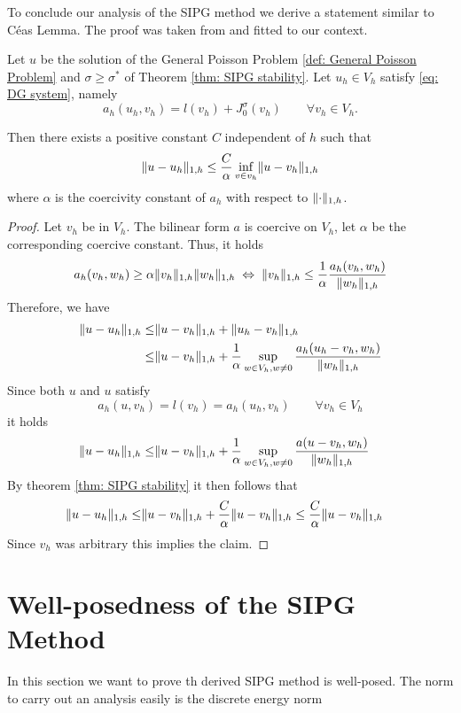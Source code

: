 To conclude our analysis of the SIPG method we derive a statement similar to C\'eas Lemma. The proof was taken from \cite[Lemma 10.5.2]{BS2002} and fitted to our context.
\begin{theorem}\label{thm: error estimate}
	Let $u$ be the solution of the General Poisson Problem \ref{def: General Poisson Problem} and $\sigma \geq \sigma^*$ of Theorem \ref{thm: SIPG stability}. Let $u_h \in V_h$ satisfy \eqref{eq: DG system}, namely
	\[
		a_h(u_h, v_h) = l(v_h) + J^\sigma_0(v_h)  \qquad \forall v_h \in V_h.
	\]
\end{theorem}
Then there exists a positive constant $C$ independent of $h$ such that 
\[
	\lVert u - u_h  \rVert_{1,h} \leq \frac C \alpha \inf_{v \in v_h} \lVert u - v_h \rVert_{1,h}
\]
where $\alpha$ is the coercivity constant of $a_h$ with respect to $\lVert \cdot \rVert_{1,h}$.

\begin{proof}
	Let $v_h$ be in $V_h$.
The bilinear form $a$ is coercive on $V_h$, let $\alpha$ be the corresponding coercive constant. 
Thus, it holds
\[
	a_h(v_h, w_h) \geq \alpha \lVert v_h \rVert_{1,h} \lVert w_h \rVert_{1,h} 
	\; \Leftrightarrow \;
	\lVert v_h \rVert_{1,h} \leq \frac 1 \alpha \frac {a_h(v_h,w_h)} {\lVert w_h \rVert_{1,h}} 	
\]
Therefore, we have
\begin{align*}
  \lVert u-u_h \rVert_{1,h} \leq& \lVert u-v_h \rVert_{1,h} + \lVert u_h-v_h \rVert_{1,h} \\
  \leq& \lVert u-v_h \rVert_{1,h} + \frac 1 \alpha \sup_{w \in V_h, w \neq 0} \frac {a_h(u_h-v_h, w_h) }{\lVert w_h \rVert_{1,h}}
\end{align*}
Since both $u$ and $u$ satisfy
\[
	a_h(u,v_h) = l(v_h) = a_h(u_h,v_h) \qquad \forall v_h \in V_h
\]
it holds
\begin{align*}
  \lVert u-u_h \rVert_{1,h} \leq& \lVert u-v_h \rVert_{1,h} + \frac 1 \alpha \sup_{w \in V_h, w \neq 0} \frac {a(u-v_h, w_h) }{\lVert w_h \rVert_{1,h}}
\end{align*}
By theorem \ref{thm: SIPG stability} it then follows that
\begin{align*}
\lVert u-u_h \rVert_{1,h} \leq& \lVert u-v_h \rVert_{1,h} + \frac C \alpha \lVert u-v_h \rVert_{1,h} \leq \frac C \alpha \lVert u-v_h \rVert_{1,h}
\end{align*}
Since $v_h$ was arbitrary this implies the claim.
\end{proof}

\section{Well-posedness of the SIPG Method}

In this section we want to prove th derived SIPG method is well-posed. The norm to carry out an analysis easily is the discrete energy norm
\begin{definition} \label{def: energy norm}
	
\end{definition}

